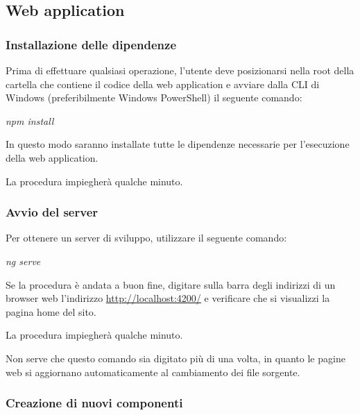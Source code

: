 \documentclass[../manuale-sviluppatore.tex]{subfiles}
\begin{document}
\subsection{Web application}%
\label{sub:web_application}


\subsubsection{Installazione delle dipendenze}%
\label{subs:installazione_delle_dipendenze}

Prima di effettuare qualsiasi operazione, l'utente deve posizionarsi nella root della cartella che contiene il codice della web application e avviare dalla CLI di Windows (preferibilmente Windows PowerShell) il seguente comando: \par\bigskip

\begin{center}
  \textit{npm install}
\end{center}
\par\bigskip

In questo modo saranno installate tutte le dipendenze necessarie per l'esecuzione della web application.

La procedura impiegherà qualche minuto.

\subsubsection{Avvio del server}%
\label{subs:avvio_del_server}

Per ottenere un server di sviluppo, utilizzare il seguente comando: \par\bigskip

\begin{center}
  \textit{ng serve}
\end{center}
\par\bigskip

Se la procedura è andata a buon fine, digitare sulla barra degli indirizzi di un browser web l'indirizzo \href{http://localhost:4200/}{http://localhost:4200/} e verificare che si visualizzi la pagina home del sito.

La procedura impiegherà qualche minuto.

Non serve che questo comando sia digitato più di una volta, in quanto le pagine web si aggiornano automaticamente al cambiamento dei file sorgente.

\subsubsection{Creazione di nuovi componenti}%
\label{subs:creazione_dei_nuovi_componenti}
\end{document}
